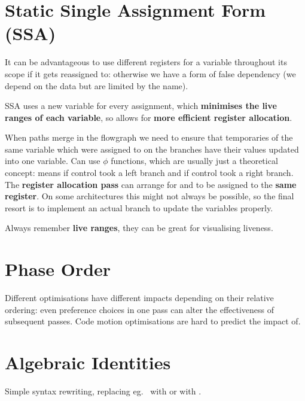 \documentclass[a4paper, 11pt]{article}
\begin{document}
\section*{Static Single Assignment Form (SSA)}
{
    It can be advantageous to use different registers for a variable throughout its scope if it gets reassigned to: otherwise we have a form of false dependency (we depend on the data but are limited by the name).

    SSA uses a new variable for every assignment, which \textbf{minimises the live ranges of each variable}, so allows for \textbf{more efficient register allocation}.

    When paths merge in the flowgraph we need to ensure that temporaries of the same variable which were assigned to on the branches have their values updated into one variable. Can use \(\phi\) functions, which are usually just a theoretical concept:  means  if control took a left branch and  if control took a right branch. The \textbf{register allocation pass} can arrange for  and  to be assigned to the \textbf{same register}. On some architectures this might not always be possible, so the final resort is to implement an actual branch to update the variables properly.

    Always remember \textbf{live ranges}, they can be great for visualising liveness.
}
\section*{Phase Order}
{
    Different optimisations have different impacts depending on their relative ordering: even preference choices in one pass can alter the effectiveness of subsequent passes. Code motion optimisations are hard to predict the impact of.
}
\section*{Algebraic Identities}
{
    Simple syntax rewriting, replacing eg.\  with  or \monospace{[1,2] ++ [3,4]} with \monospace{[1,2,3,4]}.
}
\end{document}
